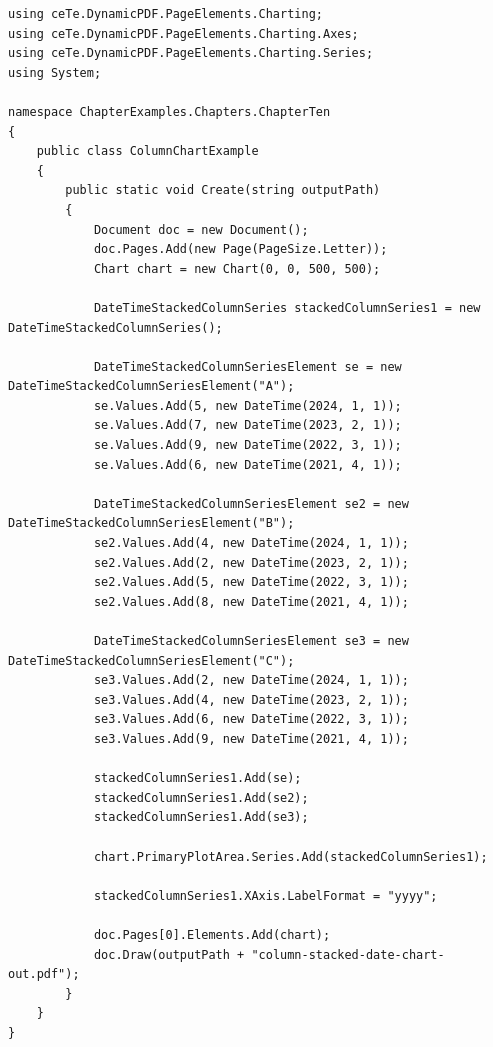 \documentclass[american,letterpaper]{tufte-book}
\numberwithin{equation}{section}
\numberwithin{figure}{section}
\begin{document}
{\bgroup{}
\begin{lstlisting}[caption={Stacked column chart of indexed data.},label={lis:Stacked-column-chart},basicstyle={\small\ttfamily},breaklines=true]
using ceTe.DynamicPDF.PageElements.Charting;
using ceTe.DynamicPDF.PageElements.Charting.Axes;
using ceTe.DynamicPDF.PageElements.Charting.Series;
using System;

namespace ChapterExamples.Chapters.ChapterTen
{
    public class ColumnChartExample
    {
        public static void Create(string outputPath)
        {
            Document doc = new Document();
            doc.Pages.Add(new Page(PageSize.Letter));
            Chart chart = new Chart(0, 0, 500, 500);

            DateTimeStackedColumnSeries stackedColumnSeries1 = new DateTimeStackedColumnSeries();

            DateTimeStackedColumnSeriesElement se = new DateTimeStackedColumnSeriesElement("A");
            se.Values.Add(5, new DateTime(2024, 1, 1));
            se.Values.Add(7, new DateTime(2023, 2, 1));
            se.Values.Add(9, new DateTime(2022, 3, 1));
            se.Values.Add(6, new DateTime(2021, 4, 1));

            DateTimeStackedColumnSeriesElement se2 = new DateTimeStackedColumnSeriesElement("B");
            se2.Values.Add(4, new DateTime(2024, 1, 1));
            se2.Values.Add(2, new DateTime(2023, 2, 1));
            se2.Values.Add(5, new DateTime(2022, 3, 1));
            se2.Values.Add(8, new DateTime(2021, 4, 1));

            DateTimeStackedColumnSeriesElement se3 = new DateTimeStackedColumnSeriesElement("C");
            se3.Values.Add(2, new DateTime(2024, 1, 1));
            se3.Values.Add(4, new DateTime(2023, 2, 1));
            se3.Values.Add(6, new DateTime(2022, 3, 1));
            se3.Values.Add(9, new DateTime(2021, 4, 1));

            stackedColumnSeries1.Add(se);
            stackedColumnSeries1.Add(se2);
            stackedColumnSeries1.Add(se3);

            chart.PrimaryPlotArea.Series.Add(stackedColumnSeries1);

            stackedColumnSeries1.XAxis.LabelFormat = "yyyy";

            doc.Pages[0].Elements.Add(chart);
            doc.Draw(outputPath + "column-stacked-date-chart-out.pdf");
        }
    }
}
\end{lstlisting}
\leavevmode\egroup

}
\end{document}
